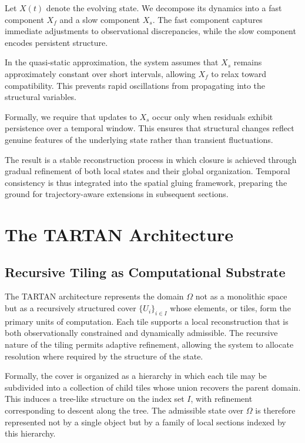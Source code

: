 \documentclass[12pt, oneside]{article}
\begin{document}
Let $X(t)$ denote the evolving state. We decompose its dynamics into a fast component $X_f$ and a slow component $X_s$. The fast component captures immediate adjustments to observational discrepancies, while the slow component encodes persistent structure.

In the quasi-static approximation, the system assumes that $X_s$ remains approximately constant over short intervals, allowing $X_f$ to relax toward compatibility. This prevents rapid oscillations from propagating into the structural variables.

Formally, we require that updates to $X_s$ occur only when residuals exhibit persistence over a temporal window. This ensures that structural changes reflect genuine features of the underlying state rather than transient fluctuations.

The result is a stable reconstruction process in which closure is achieved through gradual refinement of both local states and their global organization. Temporal consistency is thus integrated into the spatial gluing framework, preparing the ground for trajectory-aware extensions in subsequent sections.

\section{The TARTAN Architecture}

\subsection{Recursive Tiling as Computational Substrate}

The TARTAN architecture represents the domain $\Omega$ not as a monolithic space but as a recursively structured cover $\{U_i\}_{i \in I}$ whose elements, or tiles, form the primary units of computation. Each tile supports a local reconstruction that is both observationally constrained and dynamically admissible. The recursive nature of the tiling permits adaptive refinement, allowing the system to allocate resolution where required by the structure of the state.

Formally, the cover is organized as a hierarchy in which each tile may be subdivided into a collection of child tiles whose union recovers the parent domain. This induces a tree-like structure on the index set $I$, with refinement corresponding to descent along the tree. The admissible state over $\Omega$ is therefore represented not by a single object but by a family of local sections indexed by this hierarchy.
\end{document}

